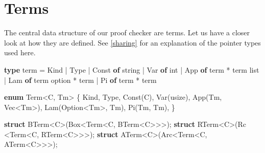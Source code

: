 \documentclass[screen,sigplan,10pt]{acmart}
\newenvironment{Shaded}{}{}
\newcommand{\DataTypeTok}[1]{\textcolor[rgb]{0.56,0.13,0.00}{#1}}
\newcommand{\KeywordTok}[1]{\textcolor[rgb]{0.00,0.44,0.13}{\textbf{#1}}}
\newcommand{\NormalTok}[1]{#1}
\newcommand{\OperatorTok}[1]{\textcolor[rgb]{0.40,0.40,0.40}{#1}}
\begin{document}
\hypertarget{terms}{%
\section{Terms}\label{terms}}

The central data structure of our proof checker are terms. Let us have a
closer look at how they are defined. See \autoref{sharing} for an
explanation of the pointer types used here.

\begin{listing}\begin{Shaded}
\begin{Highlighting}[]
\KeywordTok{type}\NormalTok{ term =}
\NormalTok{    Kind | Type}
\NormalTok{  | Const }\KeywordTok{of} \DataTypeTok{string}\NormalTok{ | Var }\KeywordTok{of} \DataTypeTok{int}
\NormalTok{  | App }\KeywordTok{of}\NormalTok{ term * term }\DataTypeTok{list}
\NormalTok{  | Lam }\KeywordTok{of}\NormalTok{ term }\DataTypeTok{option}\NormalTok{ * term}
\NormalTok{  | Pi  }\KeywordTok{of}\NormalTok{ term * term}
\end{Highlighting}
\end{Shaded}


\caption{Original terms in OCaml.}

\hypertarget{lst:oterm}{%
\label{lst:oterm}}%
\end{listing}

\begin{listing}\begin{Shaded}
\begin{Highlighting}[]
\KeywordTok{enum}\NormalTok{ Term<C, Tm> }\OperatorTok{\{}
\NormalTok{    Kind, Type,}
\NormalTok{    Const(C), Var(}\DataTypeTok{usize}\NormalTok{),}
\NormalTok{    App(Tm, }\DataTypeTok{Vec}\NormalTok{<Tm>),}
\NormalTok{    Lam(}\DataTypeTok{Option}\NormalTok{<Tm>, Tm),}
\NormalTok{    Pi(Tm, Tm),}
\OperatorTok{\}}

\KeywordTok{struct}\NormalTok{ BTerm<C>(}\DataTypeTok{Box}\NormalTok{<Term<C, BTerm<C>>>);}
\KeywordTok{struct}\NormalTok{ RTerm<C>(Rc <Term<C, RTerm<C>>>);}
\KeywordTok{struct}\NormalTok{ ATerm<C>(Arc<Term<C, ATerm<C>>>);}
\end{Highlighting}
\end{Shaded}


\caption{Original terms in Rust.}

\hypertarget{lst:term}{%
\label{lst:term}}%
\end{listing}
\end{document}
